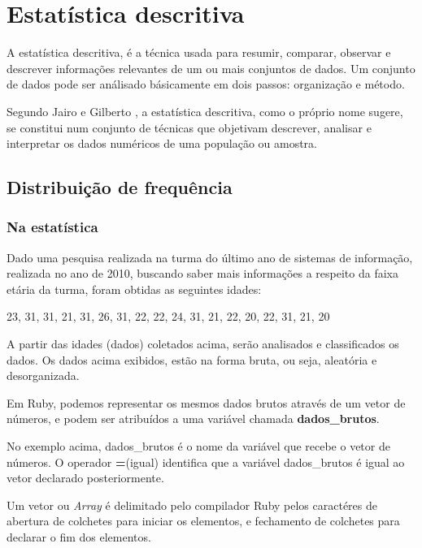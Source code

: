 \documentclass[espaco=simples,appendix=Name]{abnt}
\begin{document}
\chapter{Estatística descritiva}

A estatística descritiva, é a técnica usada para resumir, comparar, observar e descrever informações relevantes de um ou mais conjuntos de dados. Um conjunto de dados pode ser análisado básicamente em dois passos: organização e método.

Segundo Jairo e Gilberto \cite{cursoEstatistica}, a estatística descritiva, como o próprio nome sugere, se constitui num conjunto de técnicas que objetivam descrever, analisar e interpretar os dados numéricos de uma população ou amostra.


\section{ Distribuição de frequência } 

\subsection { Na estatística }
Dado uma pesquisa realizada na turma do último ano de sistemas de informação, realizada no ano de 2010, buscando saber mais informações a respeito da faixa etária da turma, foram obtidas as seguintes idades:

23, 31, 31, 21, 31, 26, 31, 22, 22, 24, 31, 21, 22, 20, 22, 31, 21, 20

A partir das idades (dados) coletados acima, serão analisados e classificados os dados. Os dados acima exibidos, estão na forma bruta, ou seja, aleatória e desorganizada. 



Em Ruby, podemos representar os mesmos dados brutos através de um vetor de números, e podem ser atribuídos a uma variável chamada \textbf{dados\_brutos}.


 


No exemplo acima, dados\_brutos é o nome da variável que recebe o vetor de números. O operador \textbf{=}(igual) identifica que a variável dados\_brutos é igual ao vetor declarado posteriormente.

Um vetor ou \textit{Array} é delimitado pelo compilador Ruby pelos caractéres de abertura de colchetes para iniciar os elementos, e fechamento de colchetes para declarar o fim dos elementos.
\end{document}
